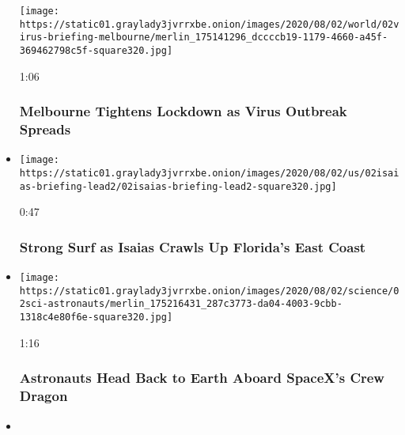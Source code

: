 \begin{itemize}
  \texttt{[image: https://static01.graylady3jvrrxbe.onion/images/2020/08/02/world/02virus-briefing-melbourne/merlin\_175141296\_dccccb19-1179-4660-a45f-369462798c5f-square320.jpg]}

  1:06

  \hypertarget{melbourne-tightens-lockdown-as-virus-outbreak-spreads}{%
  \subsubsection{Melbourne Tightens Lockdown as Virus Outbreak
  Spreads}\label{melbourne-tightens-lockdown-as-virus-outbreak-spreads}}
\item
  \href{https://www.nytimes3xbfgragh.onion/video/us/100000007268938/isaias-florida.html?action=click\&module=video-series-bar\&region=header\&pgtype=Article\&playlistId=video/latest-video}{}

  \texttt{[image: https://static01.graylady3jvrrxbe.onion/images/2020/08/02/us/02isaias-briefing-lead2/02isaias-briefing-lead2-square320.jpg]}

  0:47

  \hypertarget{strong-surf-as-isaias-crawls-up-floridas-east-coast}{%
  \subsubsection{Strong Surf as Isaias Crawls Up Florida's East
  Coast}\label{strong-surf-as-isaias-crawls-up-floridas-east-coast}}
\item
  \href{https://www.nytimes3xbfgragh.onion/video/us/100000007268936/spacex-departs-international-space-station.html?action=click\&module=video-series-bar\&region=header\&pgtype=Article\&playlistId=video/latest-video}{}

  \texttt{[image: https://static01.graylady3jvrrxbe.onion/images/2020/08/02/science/02sci-astronauts/merlin\_175216431\_287c3773-da04-4003-9cbb-1318c4e80f6e-square320.jpg]}

  1:16

  \hypertarget{astronauts-head-back-to-earth-aboard-spacexs-crew-dragon}{%
  \subsubsection{Astronauts Head Back to Earth Aboard SpaceX's Crew
  Dragon}\label{astronauts-head-back-to-earth-aboard-spacexs-crew-dragon}}
\item
  \href{https://www.nytimes3xbfgragh.onion/video/world/europe/100000007268465/coronavirus-protest-germany.html?action=click\&module=video-series-bar\&region=header\&pgtype=Article\&playlistId=video/latest-video}{}


\end{itemize}
